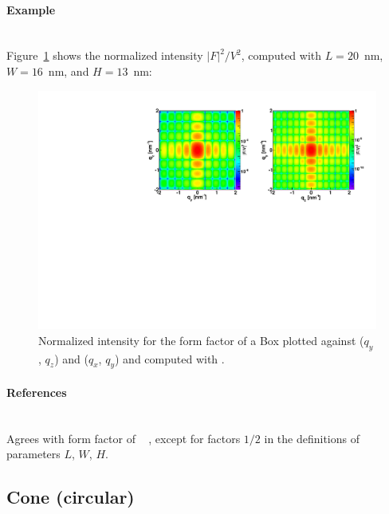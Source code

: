 \paragraph{Example}\strut\\
Figure~\ref{fig:FFBoxEx} shows the normalized intensity
$|F|^2/V^2$, computed with $L=20$~nm, $W=16$~nm, and $H=13$~nm:

\begin{figure}[H]
\begin{center}
\includegraphics[angle=-90,width=\textwidth]{fig/ff/figffbox.pdf}
\end{center}
\caption{Normalized intensity for the form factor of a Box plotted against ($q_y$, $q_z$) and  ($q_x$, $q_y$) and computed with .}
\label{fig:FFBoxEx}
\end{figure}

\paragraph{References}\strut\\
Agrees with  form factor of \IsGISAXS\
\cite[Eq.~2.38]{Laz08} \cite[Eq.~214]{ReLL09},
except for factors $1/2$ in the definitions of parameters $L$, $W$, $H$.

\clearpage
\subsection{Cone (circular)} \label{sec:Cone} 


